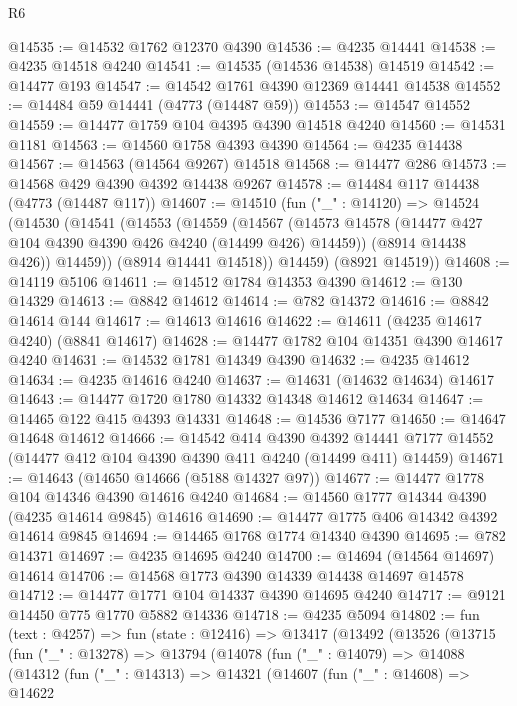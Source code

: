 \begin{lexlean}{R6}
\begin{coremodule}
@14535 := @14532 @1762 @12370 @4390
@14536 := @4235 @14441
@14538 := @4235 @14518 @4240
@14541 := @14535 (@14536 @14538) @14519
@14542 := @14477 @193
@14547 := @14542 @1761 @4390 @12369 @14441 @14538
@14552 := @14484 @59 @14441 (@4773 (@14487 @59))
@14553 := @14547 @14552
@14559 := @14477 @1759 @104 @4395 @4390 @14518 @4240
@14560 := @14531 @1181
@14563 := @14560 @1758 @4393 @4390
@14564 := @4235 @14438
@14567 := @14563 (@14564 @9267) @14518
@14568 := @14477 @286
@14573 := @14568 @429 @4390 @4392 @14438 @9267
@14578 := @14484 @117 @14438 (@4773 (@14487 @117))
@14607 := @14510
    (fun ("_" : @14120) =>
    @14524
      (@14530
        (@14541
          (@14553
            (@14559
              (@14567
                (@14573 @14578 (@14477 @427 @104 @4390 @4390 @426 @4240 (@14499 @426) @14459))
                (@8914 @14438 @426))
              @14459))
          (@8914 @14441 @14518))
        @14459)
      (@8921 @14519))
@14608 := @14119 @5106
@14611 := @14512 @1784 @14353 @4390
@14612 := @130 @14329
@14613 := @8842 @14612
@14614 := @782 @14372
@14616 := @8842 @14614 @144
@14617 := @14613 @14616
@14622 := @14611 (@4235 @14617 @4240) (@8841 @14617)
@14628 := @14477 @1782 @104 @14351 @4390 @14617 @4240
@14631 := @14532 @1781 @14349 @4390
@14632 := @4235 @14612
@14634 := @4235 @14616 @4240
@14637 := @14631 (@14632 @14634) @14617
@14643 := @14477 @1720 @1780 @14332 @14348 @14612 @14634
@14647 := @14465 @122 @415 @4393 @14331
@14648 := @14536 @7177
@14650 := @14647 @14648 @14612
@14666 := @14542
    @414
    @4390
    @4392
    @14441
    @7177
    @14552
    (@14477 @412 @104 @4390 @4390 @411 @4240 (@14499 @411) @14459)
@14671 := @14643 (@14650 @14666 (@5188 @14327 @97))
@14677 := @14477 @1778 @104 @14346 @4390 @14616 @4240
@14684 := @14560 @1777 @14344 @4390 (@4235 @14614 @9845) @14616
@14690 := @14477 @1775 @406 @14342 @4392 @14614 @9845
@14694 := @14465 @1768 @1774 @14340 @4390
@14695 := @782 @14371
@14697 := @4235 @14695 @4240
@14700 := @14694 (@14564 @14697) @14614
@14706 := @14568 @1773 @4390 @14339 @14438 @14697 @14578
@14712 := @14477 @1771 @104 @14337 @4390 @14695 @4240
@14717 := @9121 @14450 @775 @1770 @5882 @14336
@14718 := @4235 @5094
@14802 := fun (text : @4257) =>
  fun (state : @12416) =>
  @13417
    (@13492
      (@13526
        (@13715
          (fun ("_" : @13278) =>
          @13794
            (@14078
              (fun ("_" : @14079) =>
              @14088
                (@14312
                  (fun ("_" : @14313) =>
                  @14321
                    (@14607
                      (fun ("_" : @14608) =>
                      @14622

\end{coremodule}
\end{lexlean}
